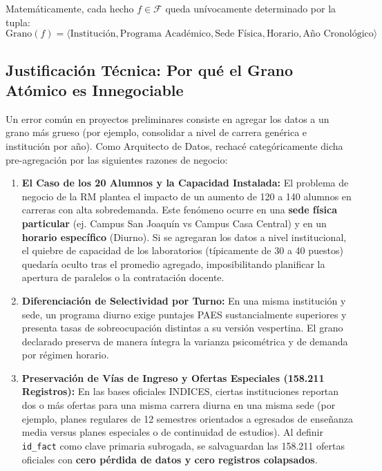 \documentclass[11pt,a4paper]{article}
\begin{document}
Matemáticamente, cada hecho $f \in \mathcal{F}$ queda unívocamente determinado por la tupla:
\begin{equation}
\text{Grano}(f) = \langle \text{Institución}, \text{Programa Académico}, \text{Sede Física}, \text{Horario}, \text{Año Cronológico} \rangle
\end{equation}

\subsection{Justificación Técnica: Por qué el Grano Atómico es Innegociable}
Un error común en proyectos preliminares consiste en agregar los datos a un grano más grueso (por ejemplo, consolidar a nivel de carrera genérica e institución por año). Como Arquitecto de Datos, rechacé categóricamente dicha pre-agregación por las siguientes razones de negocio:

\begin{enumerate}[leftmargin=*]
    \item \textbf{El Caso de los 20 Alumnos y la Capacidad Instalada:}
    El problema de negocio de la RM plantea el impacto de un aumento de 120 a 140 alumnos en carreras con alta sobredemanda. Este fenómeno ocurre en una \textbf{sede física particular} (ej. Campus San Joaquín vs Campus Casa Central) y en un \textbf{horario específico} (Diurno). Si se agregaran los datos a nivel institucional, el quiebre de capacidad de los laboratorios (típicamente de 30 a 40 puestos) quedaría oculto tras el promedio agregado, imposibilitando planificar la apertura de paralelos o la contratación docente.
    
    \item \textbf{Diferenciación de Selectividad por Turno:}
    En una misma institución y sede, un programa diurno exige puntajes PAES sustancialmente superiores y presenta tasas de sobreocupación distintas a su versión vespertina. El grano declarado preserva de manera íntegra la varianza psicométrica y de demanda por régimen horario.

    \item \textbf{Preservación de Vías de Ingreso y Ofertas Especiales (158.211 Registros):}
    En las bases oficiales INDICES, ciertas instituciones reportan dos o más ofertas para una misma carrera diurna en una misma sede (por ejemplo, planes regulares de 12 semestres orientados a egresados de enseñanza media versus planes especiales o de continuidad de estudios). Al definir \texttt{id\_fact} como clave primaria subrogada, se salvaguardan las 158.211 ofertas oficiales con \textbf{cero pérdida de datos y cero registros colapsados}.
\end{enumerate}
\end{document}
